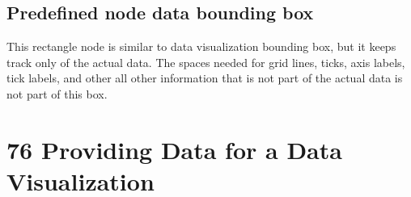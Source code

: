 \subsection{Predefined node data bounding box}
This rectangle node is similar to data visualization bounding box, but it keeps track only of the actual
data. The spaces needed for grid lines, ticks, axis labels, tick labels, and other all other information
that is not part of the actual data is not part of this box.





\section{76 Providing Data for a Data Visualization}
